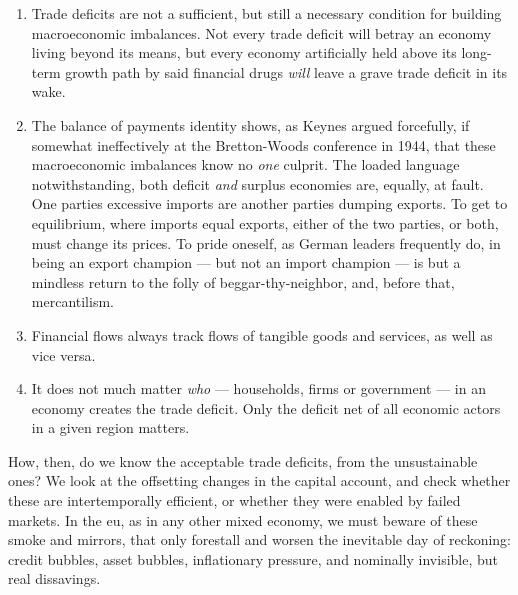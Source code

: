 \begin{enumerate}
	\item Trade deficits are not a sufficient, but still a necessary condition for building macroeconomic imbalances.
	Not every trade deficit will betray an economy living beyond its means, but every economy artificially held above its long-term growth path by said financial drugs \emph{will} leave a grave trade deficit in its wake.

	\item The balance of payments identity shows, as Keynes  argued forcefully, if somewhat ineffectively at the Bretton-Woods conference in 1944, that these macroeconomic imbalances know no \emph{one} culprit.
	The loaded language notwithstanding, both deficit \emph{and} surplus economies are, equally, at fault.
	One parties excessive imports are another parties dumping exports.
	To get to equilibrium, where imports equal exports, either of the two parties, or both, must change its prices.
	To pride oneself, as German leaders frequently do, in being an export champion --- but not an import champion --- is but a mindless return to the folly of beggar-thy-neighbor, and, before that, mercantilism.

	\item Financial flows always track flows of tangible goods and services, as well as vice versa.

	\item It does not much matter \emph{who} --- households, firms or government --- in an economy creates the trade deficit.
	Only the deficit net of all economic actors in a given region matters.
\end{enumerate}

How, then, do we know the acceptable trade deficits, from the unsustainable ones?
We look at the offsetting changes in the capital account, and check whether these are intertemporally efficient, or whether they were enabled by failed markets.
In the \gls{eu}, as in any other mixed economy, we must beware of these smoke and mirrors, that only forestall and worsen the inevitable day of reckoning:
credit bubbles, asset bubbles, inflationary pressure, and nominally invisible, but real dissavings.

